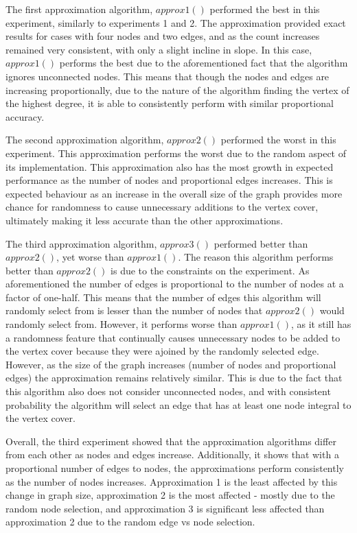 \documentclass[titlepage]{article}
\begin{document}
The first approximation algorithm, $approx1()$ performed the best in this experiment, similarly to experiments 1 and 2. The approximation provided exact results for cases with four nodes and two edges, and as the count increases remained very consistent, with only a slight incline in slope. In this case, $approx1()$ performs the best due to the aforementioned fact that the algorithm ignores unconnected nodes. This means that though the nodes and edges are increasing proportionally, due to the nature of the algorithm finding the vertex of the highest degree, it is able to consistently perform with similar proportional accuracy.

The second approximation algorithm, $approx2()$ performed the worst in this experiment. This approximation performs the worst due to the random aspect of its implementation. This approximation also has the most growth in expected performance as the number of nodes and proportional edges increases. This is expected behaviour as an increase in the overall size of the graph provides more chance for randomness to cause unnecessary additions to the vertex cover, ultimately making it less accurate than the other approximations.

The third approximation algorithm, $approx3()$ performed better than $approx2()$, yet worse than $approx1()$. The reason this algorithm performs better than $approx2()$ is due to the constraints on the experiment. As aforementioned the number of edges is proportional to the number of nodes at a factor of one-half. This means that the number of edges this algorithm will randomly select from is lesser than the number of nodes that $approx2()$ would randomly select from. However, it performs worse than $approx1()$, as it still has a randomness feature that continually causes unnecessary nodes to be added to the vertex cover because they were ajoined by the randomly selected edge. However, as the size of the graph increases (number of nodes and proportional edges) the approximation remains relatively similar. This is due to the fact that this algorithm also does not consider unconnected nodes, and with consistent probability the algorithm will select an edge that has at least one node integral to the vertex cover.

Overall, the third experiment showed that the approximation algorithms differ from each other as nodes and edges increase. Additionally, it shows that with a proportional number of edges to nodes, the approximations perform consistently as the number of nodes increases. Approximation 1 is the least affected by this change in graph size, approximation 2 is the most affected - mostly due to the random node selection, and approximation 3 is significant less affected than approximation 2 due to the random edge vs node selection.
\end{document}
